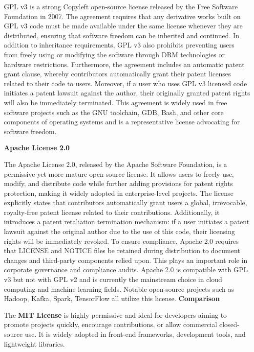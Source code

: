 \documentclass[12pt]{article}
\begin{document}
    GPL v3 is a strong Copyleft open-source license released by the Free Software Foundation in 2007. The agreement requires that any derivative works built on GPL v3 code must be made available under the same license whenever they are distributed, ensuring that software freedom can be inherited and continued. In addition to inheritance requirements, GPL v3 also prohibits preventing users from freely using or modifying the software through DRM technologies or hardware restrictions. Furthermore, the agreement includes an automatic patent grant clause, whereby contributors automatically grant their patent licenses related to their code to users. Moreover, if a user who uses GPL v3 licensed code initiates a patent lawsuit against the author, their originally granted patent rights will also be immediately terminated. This agreement is widely used in free software projects such as the GNU toolchain, GDB, Bash, and other core components of operating systems and is a representative license advocating for software freedom.


  \noindent\textbf{Apache License 2.0}

    The Apache License 2.0, released by the Apache Software Foundation, is a permissive yet more mature open-source license. It allows users to freely use, modify, and distribute code while further adding provisions for patent rights protection, making it widely adopted in enterprise-level projects. The license explicitly states that contributors automatically grant users a global, irrevocable, royalty-free patent license related to their contributions. Additionally, it introduces a patent retaliation termination mechanism: if a user initiates a patent lawsuit against the original author due to the use of this code, their licensing rights will be immediately revoked. To ensure compliance, Apache 2.0 requires that LICENSE and NOTICE files be retained during distribution to document changes and third-party components relied upon. This plays an important role in corporate governance and compliance audits. Apache 2.0 is compatible with GPL v3 but not with GPL v2 and is currently the mainstream choice in cloud computing and machine learning fields. Notable open-source projects such as Hadoop, Kafka, Spark, TensorFlow all utilize this license.
\noindent\textbf{Comparison}

The \textbf{MIT License} is highly permissive and ideal for developers aiming to promote projects quickly, encourage contributions, or allow commercial closed-source use. It is widely adopted in front-end frameworks, development tools, and lightweight libraries.
\end{document}
